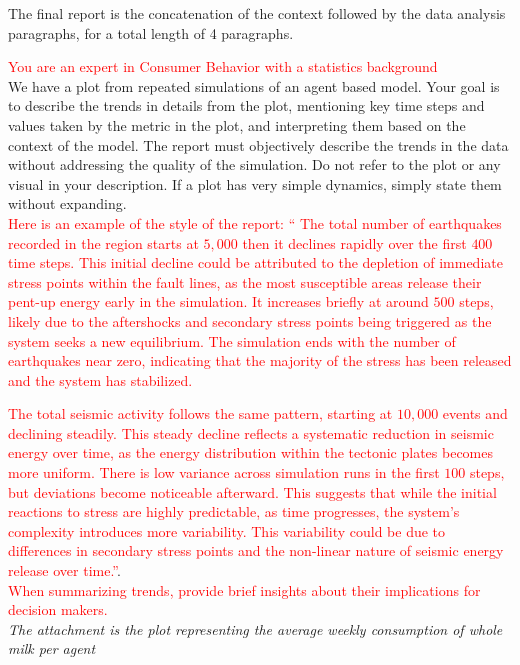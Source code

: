 \documentclass[preprint,12pt]{elsarticle}
\begin{document}
The final report is the concatenation of the context followed by the data analysis paragraphs, for a total length of 4 paragraphs.\\

\vspace*{-2cm}
\begin{tcolorbox}[colback=white!95!gray, colframe=black, title=Prompt 2 : \textcolor{red}{text} is a feature from the design of experiment. \textit{text} is a part of the prompt changing according to the model and the experiment,  label=box:prompt2]
\textcolor{red}{You are an expert in Consumer Behavior with a statistics background}\\

We have a plot from repeated simulations of an agent based model. Your goal is to describe the trends in details from the plot, mentioning key time steps and values taken by the metric in the plot, and interpreting them based on the context of the model. The report must objectively describe the trends in the data without addressing the quality of the simulation. Do not refer to the plot or any visual in your description. If a plot has very simple dynamics, simply state them without expanding.\\

\textcolor{red}{Here is an example of the style of the report: “ The total number of earthquakes recorded in the region starts at $5,000$ then it declines rapidly over the first $400$ time steps. This initial decline could be attributed to the depletion of immediate stress points within the fault lines, as the most susceptible areas release their pent-up energy early in the simulation. It increases briefly at around $500$ steps, likely due to the aftershocks and secondary stress points being triggered as the system seeks a new equilibrium. The simulation ends with the number of earthquakes near zero, indicating that the majority of the stress has been released and the system has stabilized.\\}

\textcolor{red}{The total seismic activity follows the same pattern, starting at $10,000$ events and declining steadily. This steady decline reflects a systematic reduction in seismic energy over time, as the energy distribution within the tectonic plates becomes more uniform. There is low variance across simulation runs in the first $100$ steps, but deviations become noticeable afterward. This suggests that while the initial reactions to stress are highly predictable, as time progresses, the system's complexity introduces more variability. This variability could be due to differences in secondary stress points and the non-linear nature of seismic energy release over time.”}.\\

\textcolor{red}{When summarizing trends, provide brief insights about their implications for decision makers.}\\

\textit{The attachment is the plot representing the average weekly consumption of whole milk per agent}


\end{tcolorbox}
\end{document}
